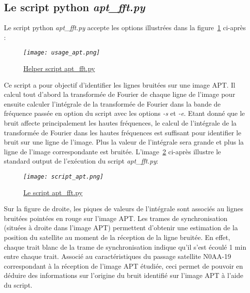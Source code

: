 \documentclass[12pt,fleqn]{book} %
\begin{document}
\subsection{Le script python \emph{apt\_fft.py}}
Le script python \emph{apt\_fft.py} accepte les options illustrées dans la figure~\underline{\color{blue}\ref{usage_apt}} ci-après :
\begin{figure}[H]
	\centering
	\itshape
	\texttt{[image: usage\_apt.png]}
	\caption{\label{usage_apt} \underline{Helper script apt\_fft.py}}
\end{figure}
Ce script a pour objectif d'identifier les lignes bruitées sur une image APT. Il calcul tout d'abord la transformée de Fourier de chaque ligne de l'image pour ensuite calculer l'intégrale de la transformée de Fourier dans la bande de fréquence passée en option du script avec les options \emph{-s} et \emph{-e}.
Etant donné que le bruit affecte principalement les hautes fréquences, le calcul de l'intégrale de la transformée de Fourier dans les hautes fréquences est suffisant pour identifier le bruit sur une ligne de l'image. Plus la valeur de l'intégrale sera grande et plus la ligne de l'image correspondante est bruitée.
L'image~\underline{\color{blue}\ref{script_apt}} ci-après illustre le standard output de l'exécution du script \emph{apt\_fft.py}:
\begin{figure}[H]
	\centering
	\itshape
	\texttt{[image: script\_apt.png]}
	\caption{\label{script_apt} \underline{Le script apt\_fft.py}}
\end{figure}
Sur la figure de droite, les piques de valeurs de l'intégrale sont associés au lignes bruitées pointées en rouge sur l'image APT. Les trames de synchronisation (situées à droite dans l'image APT) permettent d'obtenir une estimation de la position du satellite au moment de la réception de la ligne bruitée.
En effet, chaque trait blanc de la trame de synchronisation indique qu'il s'est écoulé 1 min entre chaque trait. Associé au caractéristiques du passage satellite N0AA-19 correspondant à la réception de l'image APT étudiée, ceci permet de pouvoir en déduire des informations sur l'origine du bruit identifié sur l'image APT à l'aide du script. 
\end{document}
